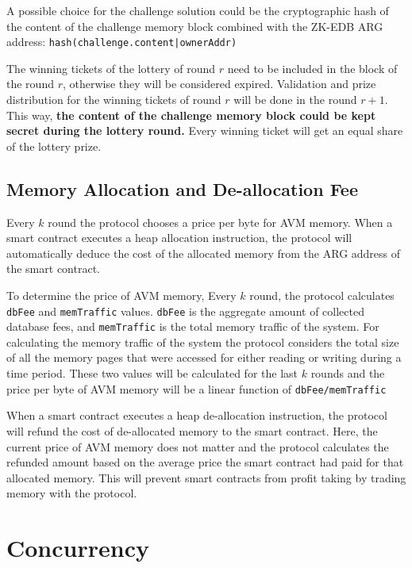 \documentclass[11pt, a4paper]{report}
\begin{document}
    A possible choice for the challenge solution could be the cryptographic hash of the content of the challenge
    memory block combined with the ZK-EDB ARG address: \texttt{hash(challenge.content|ownerAddr)}

    The winning tickets of the lottery of round \(r\) need to be included in the block of the round \(r\),
    otherwise they will be considered expired. Validation and prize distribution for the winning tickets of round
    \(r\) will be done in the round \(r + 1\). This way, \textbf{the content of the challenge memory block could be
    kept secret during the lottery round.} Every winning ticket will get an equal share of the lottery prize.

    \subsection{Memory Allocation and De-allocation Fee}\label{subsec:memory-allocation-and-de-allocation}

    Every \(k\) round the protocol chooses a price per byte for AVM memory. When a smart contract executes a heap
    allocation instruction, the protocol will automatically deduce the cost of the allocated memory from the ARG
    address of the smart contract.

    To determine the price of AVM memory, Every \(k\) round, the protocol calculates \texttt{dbFee} and
    \texttt{memTraffic} values. \texttt{dbFee} is the aggregate amount of collected database fees, and
    \texttt{memTraffic} is the total memory traffic of the system. For calculating the memory traffic of the system
    the protocol considers the total size of all the memory pages that were accessed for either reading or writing
    during a time period. These two values will be calculated for the last \(k\) rounds and the price per byte of
    AVM memory will be a linear function of \texttt{dbFee/memTraffic}

    When a smart contract executes a heap de-allocation instruction, the protocol will refund the cost of
    de-allocated memory to the smart contract. Here, the current price of AVM memory does not matter and the protocol
    calculates the refunded amount based on the average price the smart contract had paid for that allocated memory.
    This will prevent smart contracts from profit taking by trading memory with the protocol.


    \section{Concurrency}\label{sec:concurrency}
\end{document}
